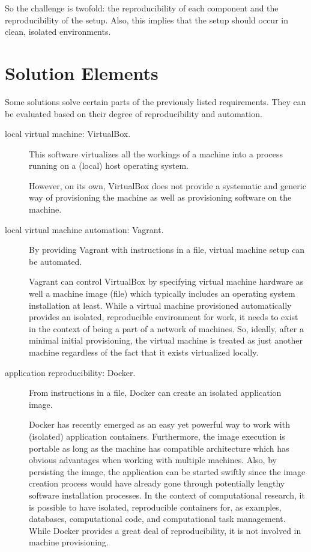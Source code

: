 So the challenge is twofold: the reproducibility of each component and the reproducibility of the setup.
%
Also, this implies that the setup should occur in clean, isolated environments.


\section{Solution Elements}


Some solutions solve certain parts of the previously listed requirements.
%
They can be evaluated based on their degree of reproducibility and automation.


\begin{description}


\item[local virtual machine: \textsf{VirtualBox}.]
  This software virtualizes all the workings of a machine into a process running on a (local) host operating system.

  
  However, on its own, \textsf{VirtualBox} does not provide a systematic and generic way of provisioning the machine as well as provisioning software on the machine.


\item[local virtual machine automation: \textsf{Vagrant}.]
  By providing \textsf{Vagrant} with instructions in a file, virtual machine setup can be automated.
  

  \textsf{Vagrant} can control \textsf{VirtualBox} by specifying virtual machine hardware as well a machine image (file) which typically includes an operating system installation at least.
  While a virtual machine provisioned automatically provides an isolated, reproducible environment for work, it needs to exist in the context of being a part of a network of machines.
  So, ideally, after a minimal initial provisioning, the virtual machine is treated as just another machine regardless of the fact that it exists virtualized locally.


\item[application reproducibility: \textsf{Docker}.]
  From instructions in a file, \textsf{Docker} can create an isolated application image.


  \textsf{Docker} has recently emerged as an easy yet powerful way to work with (isolated) application containers.
  Furthermore, the image execution is portable as long as the machine has compatible architecture which has obvious advantages when working with multiple machines.
  Also, by persisting the image, the application can be started swiftly since the image creation process would have already gone through potentially lengthy software installation processes.
%
  In the context of computational research, it is possible to have isolated, reproducible containers for, as examples, databases, computational code, and computational task management.
  While \textsf{Docker} provides a great deal of reproducibility, it is not involved in machine provisioning.




\end{description}
